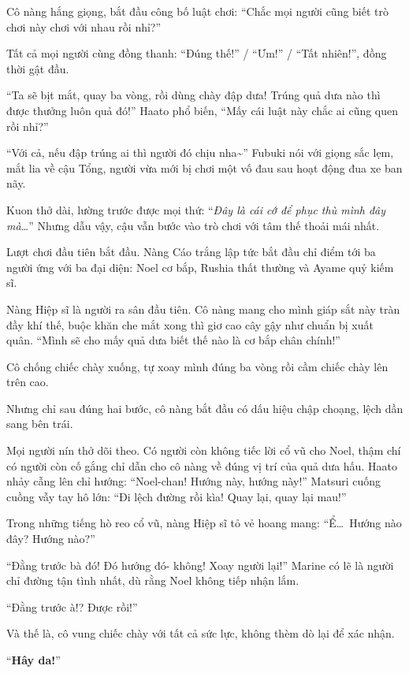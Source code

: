 \documentclass[../main.tex]{subfiles}
\begin{document}
Cô nàng hắng giọng, bắt đầu công bố luật chơi: ``Chắc mọi người cũng biết trò chơi này chơi với nhau rồi nhỉ?''

Tất cả mọi người cùng đồng thanh: ``Đúng thế!'' / ``Ưm!'' / ``Tất nhiên!'', đồng thời gật đầu.

``Ta sẽ bịt mắt, quay ba vòng, rồi dùng chày đập dưa! Trúng quả dưa nào thì được thưởng luôn quả đó!'' Haato phổ biến, ``Mấy cái luật này chắc ai cũng quen rồi nhỉ?''

``Với cả, nếu đập trúng ai thì người đó chịu nha\~{}'' Fubuki nói với giọng sắc lẹm, mắt lia về cậu Tổng, người vừa mới bị chơi một vố đau sau hoạt động đua xe ban nãy.

Kuon thở dài, lường trước được mọi thứ: ``\textit{Đây là cái cớ để phục thù mình đây mà\dots}'' Nhưng dẫu vậy, cậu vẫn bước vào trò chơi với tâm thế thoải mái nhất.

\ct

Lượt chơi đầu tiên bắt đầu. Nàng Cáo trắng lập tức bắt đầu chỉ điểm tới ba người ứng với ba đại diện: Noel cơ bắp, Rushia thất thường và Ayame quỷ kiếm sĩ.

Nàng Hiệp sĩ là người ra sân đầu tiên. Cô nàng mang cho mình giáp sắt này tràn đầy khí thế, buộc khăn che mắt xong thì giơ cao cây gậy như chuẩn bị xuất quân. ``Mình sẽ cho mấy quả dưa biết thế nào là cơ bắp chân chính!''

Cô chống chiếc chày xuống, tự xoay mình đúng ba vòng rồi cầm chiếc chày lên trên cao.

Nhưng chỉ sau đúng hai bước, cô nàng bắt đầu có dấu hiệu chập choạng, lệch dần sang bên trái.

Mọi người nín thở dõi theo. Có người còn không tiếc lời cổ vũ cho Noel, thậm chí có người còn cố gắng chỉ dẫn cho cô nàng về đúng vị trí của quả dưa hấu. Haato nhảy cẫng lên chỉ hướng: ``Noel-chan! Hướng này, hướng này!'' Matsuri cuống cuồng vẫy tay hô lớn: ``Đi lệch đường rồi kìa! Quay lại, quay lại mau!''

Trong những tiếng hò reo cổ vũ, nàng Hiệp sĩ tỏ vẻ hoang mang: ``Ể\dots\ Hướng nào đây? Hướng nào?''

``Đằng trước bà đó! Đó hướng đó- không! Xoay người lại!'' Marine có lẽ là người chỉ đường tận tình nhất, dù rằng Noel không tiếp nhận lắm.

``Đằng trước à!? Được rồi!''

Và thế là, cô vung chiếc chày với tất cả sức lực, không thèm dò lại để xác nhận.

``\textbf{Hây da!}''
\end{document}
